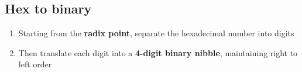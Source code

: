 \documentclass{article}[18pt]
\begin{document}
\subsection{Hex to binary}
\begin{enumerate}
\item Starting from the \textbf{radix point}, separate the hexadecimal number into digits
\item Then translate each digit into a \textbf{4-digit binary nibble}, maintaining right to left order
\end{enumerate}
\end{document}

